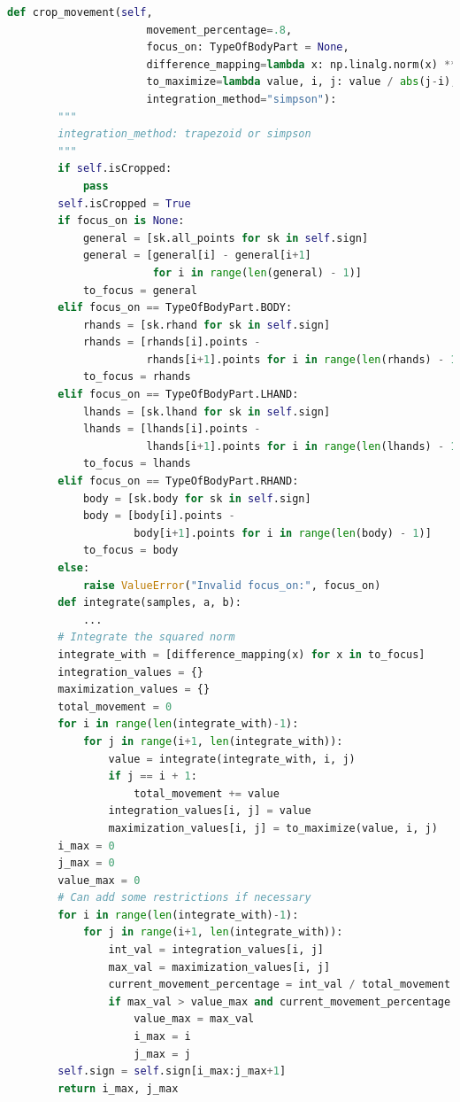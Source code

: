 \begin{lstlisting}[basicstyle=\tiny,language=Python, caption={Método crop$\_{}$movement de la clase TokenLSC}, label={code:tokenlsc:cropMovement}]
def crop_movement(self,
                      movement_percentage=.8,
                      focus_on: TypeOfBodyPart = None,
                      difference_mapping=lambda x: np.linalg.norm(x) ** 2,
                      to_maximize=lambda value, i, j: value / abs(j-i),
                      integration_method="simpson"):
        """
        integration_method: trapezoid or simpson
        """
        if self.isCropped:
            pass
        self.isCropped = True
        if focus_on is None:
            general = [sk.all_points for sk in self.sign]
            general = [general[i] - general[i+1]
                       for i in range(len(general) - 1)]
            to_focus = general
        elif focus_on == TypeOfBodyPart.BODY:
            rhands = [sk.rhand for sk in self.sign]
            rhands = [rhands[i].points -
                      rhands[i+1].points for i in range(len(rhands) - 1)]
            to_focus = rhands
        elif focus_on == TypeOfBodyPart.LHAND:
            lhands = [sk.lhand for sk in self.sign]
            lhands = [lhands[i].points -
                      lhands[i+1].points for i in range(len(lhands) - 1)]
            to_focus = lhands
        elif focus_on == TypeOfBodyPart.RHAND:
            body = [sk.body for sk in self.sign]
            body = [body[i].points -
                    body[i+1].points for i in range(len(body) - 1)]
            to_focus = body
        else:
            raise ValueError("Invalid focus_on:", focus_on)
        def integrate(samples, a, b):
            ...
        # Integrate the squared norm
        integrate_with = [difference_mapping(x) for x in to_focus]
        integration_values = {}
        maximization_values = {}
        total_movement = 0
        for i in range(len(integrate_with)-1):
            for j in range(i+1, len(integrate_with)):
                value = integrate(integrate_with, i, j)
                if j == i + 1:
                    total_movement += value
                integration_values[i, j] = value
                maximization_values[i, j] = to_maximize(value, i, j)        
        i_max = 0
        j_max = 0
        value_max = 0
        # Can add some restrictions if necessary
        for i in range(len(integrate_with)-1):
            for j in range(i+1, len(integrate_with)):
                int_val = integration_values[i, j]
                max_val = maximization_values[i, j]
                current_movement_percentage = int_val / total_movement
                if max_val > value_max and current_movement_percentage >= movement_percentage:
                    value_max = max_val
                    i_max = i
                    j_max = j
        self.sign = self.sign[i_max:j_max+1]
        return i_max, j_max
\end{lstlisting}

